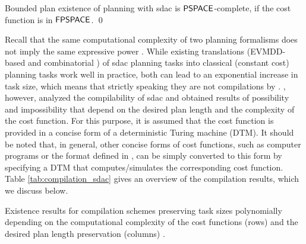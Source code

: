 \begin{theorem}\label{thm:plan_existence}
    Bounded plan existence of planning with sdac is $\mathsf{PSPACE}$-complete, if the cost function is in $\mathsf{FPSPACE}$. \qed
\end{theorem}


Recall that the same computational complexity of two planning formalisms does not imply the same expressive power \autocite{nebel-jair2000}.
While existing translations (EVMDD-based and combinatorial \autocite{geisser-et-al-ijcai2015,geisser-phd2018}) of sdac planning tasks into classical (constant cost) planning tasks work well in practice, both can lead to an exponential increase in task size, which means that strictly speaking they are not compilations by .
%
\textcite{speck-et-al-icaps2021}, however, analyzed the compilability of sdac and obtained results of possibility and impossibility that depend on the desired plan length and the complexity of the cost function.
For this purpose, it is assumed that the cost function is provided in a concise form of a deterministic Turing machine (DTM).
It should be noted that, in general, other concise forms of cost functions, such as computer programs or the format defined in , can be simply converted to this form by specifying a DTM that computes/simulates the corresponding cost function.
Table \ref{tab:compilation_sdac} gives an overview of the compilation results, which we discuss below.

\begin{table}
    
    \caption[Compilability results for planning with state-dependent action cost.]{Existence results for compilation schemes preserving task sizes polynomially depending on the computational complexity of the cost functions (rows) and the desired plan length preservation (columns) \autocite{speck-et-al-icaps2021}.}
    \label{tab:compilation_sdac}
\end{table}

